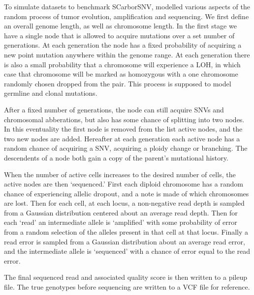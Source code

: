 \documentclass[../../main.tex]{subfiles}
\begin{document}
To simulate datasets to benchmark SCarborSNV, modelled various aspects of the random process of tumor evolution, amplification and sequencing.
We first define an overall genome length, as well as chromosome length.
In the first stage we have a single node that is allowed to acquire mutations over a set number of generations.
At each generation the node has a fixed probability of acquiring a new point mutation anywhere within the genome range.
At each generation there is also a small probability that a chromosome will experience a LOH, in which case that chromosome will be marked as homozygous with a one chromosome randomly chosen dropped from the pair.
This process is supposed to model germline and clonal mutations.

After a fixed number of generations, the node can still acquire SNVs and chromosomal abberations, but also has some chance of splitting into two nodes.
In this eventuality the first node is removed from the list active nodes, and the two new nodes are added.
Hereafter at each generation each active node has a random chance of acquiring  a SNV, acquiring a ploidy change or branching.
The descendents of a node both gain a copy of the parent's mutational history.

When the number of active cells increases to the desired number of cells, the active nodes are then `sequenced.'
First each diploid chromosome has a random chance of experiencing allelic dropout, and a note is made of which chromosomes are lost.
Then for each cell, at each locus, a non-negative read depth is sampled from a Gaussian distribution centered about an average read depth.
Then for each `read' an intermediate allele is `amplified' with some probability of error from a random selection of the alleles present in that cell at that locus.
Finally a read error is sampled from a Gaussian distribution about an average read error, and the intermediate allele is `sequenced' with a chance of error equal to the read error.

The final sequenced read and associated quality score is then written to a pileup file.
The true genotypes before sequencing are written to a VCF file for reference.
\end{document}
